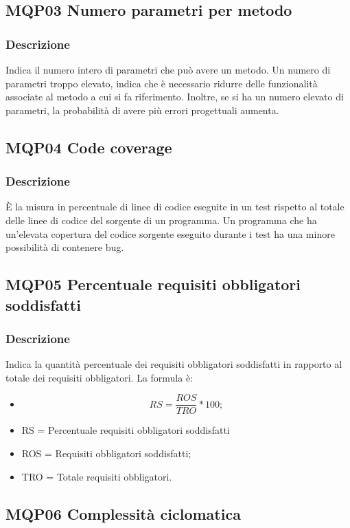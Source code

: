 \documentclass[a4paper]{article}
\begin{document}
\subsection{MQP03 Numero parametri per metodo}
\subsubsection{Descrizione}
Indica il numero intero di parametri che può avere un metodo. Un numero di parametri troppo elevato, indica che è necessario ridurre delle funzionalità associate al metodo a cui si fa riferimento. Inoltre, se si ha un numero elevato di parametri, la probabilità di avere più errori progettuali aumenta.

\subsection{MQP04 Code coverage}
\subsubsection{Descrizione}
È la misura in percentuale di linee di codice eseguite in un test rispetto al totale delle linee di codice del sorgente di un programma. Un programma che ha un’elevata copertura del codice sorgente eseguito durante i test ha una minore possibilità di contenere bug.

\subsection{MQP05 Percentuale requisiti obbligatori soddisfatti}
\subsubsection{Descrizione}
Indica la quantità percentuale dei requisiti obbligatori soddisfatti in rapporto al totale dei requisiti obbligatori.
La formula è:
\begin{itemize}
  \item \[RS = \frac{ROS}{TRO} * 100;\]
  \item RS = Percentuale requisiti obbligatori soddisfatti
  \item ROS = Requisiti obbligatori soddisfatti;
  \item TRO = Totale requisiti 	obbligatori.
  \end{itemize}


\subsection{MQP06 Complessità ciclomatica}
\end{document}
